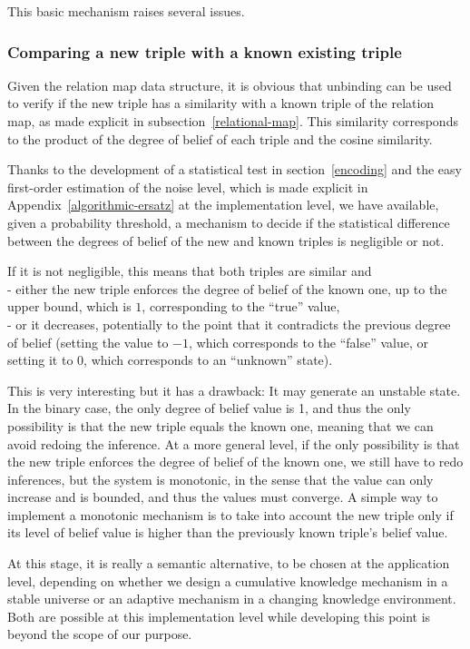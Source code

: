 \documentclass[sn-mathphys]{sn-jnl}
\begin{document}
This basic mechanism raises several issues.

\subsubsection{Comparing a new triple with a known existing triple}

Given the relation map data structure, it is obvious that unbinding can be used to verify if the new triple has a similarity with a known triple of the relation map, as made explicit in subsection~\ref{relational-map}. This similarity corresponds to the product of the degree of belief of each triple and the cosine similarity.

Thanks to the development of a statistical test in section~\ref{encoding} and the easy first-order estimation of the noise level, which is made explicit in Appendix~\ref{algorithmic-ersatz} at the implementation level, we have available, given a probability threshold, a mechanism to decide if the statistical difference between the degrees of belief of the new and known triples is negligible or not.

If it is not negligible, this means that both triples are similar and
\\- either the new triple enforces the degree of belief of the known one, up to the upper bound, which is $1$, corresponding to the ``true'' value,
\\- or it decreases, potentially to the point that it contradicts the previous degree of belief (setting the value to $-1$, which corresponds to the ``false'' value, or setting it to $0$, which corresponds to an ``unknown'' state).

This is very interesting but it has a drawback: It may generate an unstable state. In the binary case, the only degree of belief value is 1, and thus the only possibility is that the new triple equals the known one, meaning that we can avoid redoing the inference. At a more general level, if the only possibility is that the new triple enforces the degree of belief of the known one, we still have to redo inferences, but the system is monotonic, in the sense that the value can only increase and is bounded, and thus the values must converge. A simple way to implement a monotonic mechanism is to take into account the new triple only if its level of belief value is higher than the previously known triple's belief value.

At this stage, it is really a semantic alternative, to be chosen at the application level, depending on whether we design a cumulative knowledge mechanism in a stable universe or an adaptive mechanism in a changing knowledge environment. Both are possible at this implementation level while developing this point is beyond the scope of our purpose.
\end{document}

